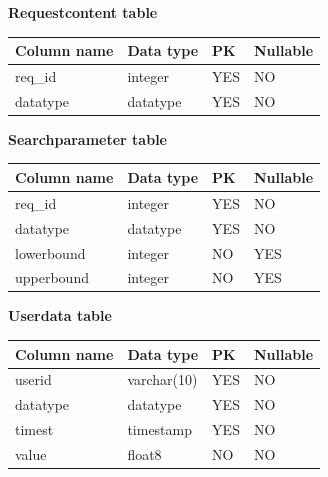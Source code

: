 \documentclass[titlepage]{article}
\begin{document}
	\vspace{\baselineskip}
	\vspace{\baselineskip}
	
	{\bf Requestcontent table} 
	\renewcommand*{\arraystretch}{1.4}
	\begin{longtable}{| p{3 cm} | p{2 cm} | p{2 cm} | p{2 cm} |} \hline
		Column name & Data type & PK & Nullable \\ \hline
		req\_id & integer & YES & NO \\ \hline
		datatype & datatype & YES & NO \\ \hline
	\end{longtable}
	
	\vspace{\baselineskip}
	\vspace{\baselineskip}
	
	{\bf Searchparameter table} 
	\renewcommand*{\arraystretch}{1.4}
	\begin{longtable}{| p{3 cm} | p{2 cm} | p{2 cm} | p{2 cm} |} \hline
		Column name & Data type & PK & Nullable \\ \hline
		req\_id & integer & YES & NO \\ \hline
		datatype & datatype & YES & NO \\ \hline
		lowerbound & integer & NO & YES \\ \hline
		upperbound & integer & NO & YES \\ \hline
	\end{longtable}
	
	\vspace{\baselineskip}
	\vspace{\baselineskip}
	
	{\bf Userdata table} 
	\renewcommand*{\arraystretch}{1.4}
	\begin{longtable}{| p{3 cm} | p{2 cm} | p{2 cm} | p{2 cm} |} \hline
		Column name & Data type & PK & Nullable \\ \hline
		userid & varchar(10) & YES & NO \\ \hline
		datatype & datatype & YES & NO \\ \hline
		timest & timestamp & YES & NO \\ \hline
		value & float8 & NO & NO \\ \hline
	\end{longtable}
	
\end{document}
